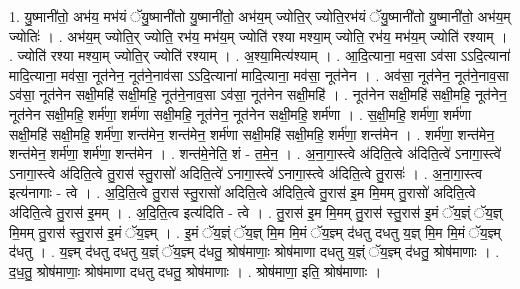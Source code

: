 \documentclass[17pt]{extarticle}
\begin{document}
1. यु॒ष्मानी॑तो॒ अभ॑य॒ मभ॑यं ॅयु॒ष्मानी॑तो यु॒ष्मानी॑तो॒ अभ॑य॒म् ज्योति॒र् ज्योति॒रभ॑यं ॅयु॒ष्मानी॑तो यु॒ष्मानी॑तो॒ अभ॑य॒म् ज्योतिः॑ । . अभ॑य॒म् ज्योति॒र् ज्योति॒ रभ॑य॒ मभ॑य॒म् ज्योति॑ रश्या मश्या॒म् ज्योति॒ रभ॑य॒ मभ॑य॒म् ज्योति॑ रश्याम् । . ज्योति॑ रश्या मश्या॒म् ज्योति॒र् ज्योति॑ रश्याम् । . अ॒श्या॒मित्य॑श्याम् । . आ॒दि॒त्याना॒ मव॒सा ऽव॑सा ऽऽदि॒त्याना॑ मादि॒त्याना॒ मव॑सा॒ नूत॑नेन॒ नूत॑ने॒नाव॑सा ऽऽदि॒त्याना॑ मादि॒त्याना॒ मव॑सा॒ नूत॑नेन । . अव॑सा॒ नूत॑नेन॒ नूत॑ने॒नाव॒सा ऽव॑सा॒ नूत॑नेन सक्षी॒महि॑ सक्षी॒महि॒ नूत॑ने॒नाव॒सा ऽव॑सा॒ नूत॑नेन सक्षी॒महि॑ । . नूत॑नेन सक्षी॒महि॑ सक्षी॒महि॒ नूत॑नेन॒ नूत॑नेन सक्षी॒महि॒ शर्म॑णा॒ शर्म॑णा सक्षी॒महि॒ नूत॑नेन॒ नूत॑नेन सक्षी॒महि॒ शर्म॑णा । . स॒क्षी॒महि॒ शर्म॑णा॒ शर्म॑णा सक्षी॒महि॑ सक्षी॒महि॒ शर्म॑णा॒ शन्त॑मेन॒ शन्त॑मेन॒ शर्म॑णा सक्षी॒महि॑ सक्षी॒महि॒ शर्म॑णा॒ शन्त॑मेन । . शर्म॑णा॒ शन्त॑मेन॒ शन्त॑मेन॒ शर्म॑णा॒ शर्म॑णा॒ शन्त॑मेन । . शन्त॑मे॒नेति॒ शं - त॒मे॒न॒ । . अ॒ना॒गा॒स्त्वे अ॑दिति॒त्वे अ॑दिति॒त्वे॑ ऽनागा॒स्त्वे॑ ऽनागा॒स्त्वे अ॑दिति॒त्वे तु॒रास॑ स्तु॒रासो॑ अदिति॒त्वे॑ ऽनागा॒स्त्वे॑ ऽनागा॒स्त्वे अ॑दिति॒त्वे तु॒रासः॑ । . अ॒ना॒गा॒स्त्व इत्य॑नागाः - त्वे । . अ॒दि॒ति॒त्वे तु॒रास॑ स्तु॒रासो॑ अदिति॒त्वे अ॑दिति॒त्वे तु॒रास॑ इ॒म मि॒मम् तु॒रासो॑ अदिति॒त्वे अ॑दिति॒त्वे तु॒रास॑ इ॒मम् । . अ॒दि॒ति॒त्व इत्य॑दिति - त्वे । . तु॒रास॑ इ॒म मि॒मम् तु॒रास॑ स्तु॒रास॑ इ॒मं ॅय॒ज्ञ्ं ॅय॒ज्ञ् मि॒मम् तु॒रास॑ स्तु॒रास॑ इ॒मं ॅय॒ज्ञ्म् । . इ॒मं ॅय॒ज्ञ्ं ॅय॒ज्ञ् मि॒म मि॒मं ॅय॒ज्ञ्म् द॑धतु दधतु य॒ज्ञ् मि॒म मि॒मं ॅय॒ज्ञ्म् द॑धतु । . य॒ज्ञ्म् द॑धतु दधतु य॒ज्ञ्ं ॅय॒ज्ञ्म् द॑धतु॒ श्रोष॑माणाः॒ श्रोष॑माणा दधतु य॒ज्ञ्ं ॅय॒ज्ञ्म् द॑धतु॒ श्रोष॑माणाः । . द॒ध॒तु॒ श्रोष॑माणाः॒ श्रोष॑माणा दधतु दधतु॒ श्रोष॑माणाः । . श्रोष॑माणा॒ इति॒ श्रोष॑माणाः । \newline
\end{document}
